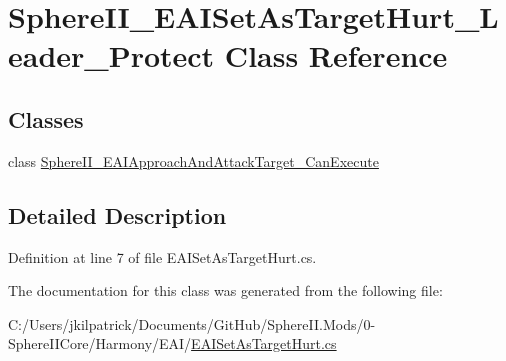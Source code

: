 \hypertarget{class_sphere_i_i___e_a_i_set_as_target_hurt___leader___protect}{}\section{Sphere\+I\+I\+\_\+\+E\+A\+I\+Set\+As\+Target\+Hurt\+\_\+\+Leader\+\_\+\+Protect Class Reference}
\label{class_sphere_i_i___e_a_i_set_as_target_hurt___leader___protect}
\subsection*{Classes}
\begin{DoxyCompactItemize}
\item 
class \mbox{\hyperlink{class_sphere_i_i___e_a_i_set_as_target_hurt___leader___protect_1_1_sphere_i_i___e_a_i_approach_and_attack_target___can_execute}{Sphere\+I\+I\+\_\+\+E\+A\+I\+Approach\+And\+Attack\+Target\+\_\+\+Can\+Execute}}
\end{DoxyCompactItemize}


\subsection{Detailed Description}


Definition at line 7 of file E\+A\+I\+Set\+As\+Target\+Hurt.\+cs.



The documentation for this class was generated from the following file\+:\begin{DoxyCompactItemize}
\item 
C\+:/\+Users/jkilpatrick/\+Documents/\+Git\+Hub/\+Sphere\+I\+I.\+Mods/0-\/\+Sphere\+I\+I\+Core/\+Harmony/\+E\+A\+I/\mbox{\hyperlink{_e_a_i_set_as_target_hurt_8cs}{E\+A\+I\+Set\+As\+Target\+Hurt.\+cs}}\end{DoxyCompactItemize}
